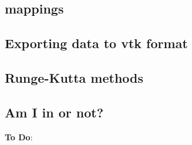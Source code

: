 \documentclass[a4paper]{article}
\begin{document}
\subsection{mappings}  %

\newpage %
\subsection{Exporting data to vtk format}  %

\newpage %
\subsection{Runge-Kutta methods}  %

\newpage %
\subsection{Am I in or not?}  %





\newpage
{\bf To Do}:
\end{document}
